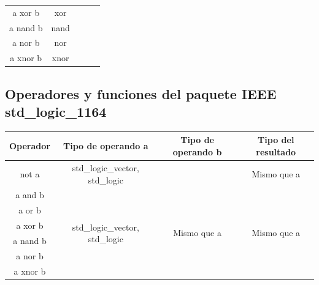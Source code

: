 \begin{table}[H]
\begin{tabular}{|c|c|c|c|c|}
		\cline{1-2}
		a xor b  & xor               &                                             &                                    &                                    \\
		\cline{1-2}
		a nand b & nand              &                                             &                                    &                                    \\
		\cline{1-2}
		a nor b  & nor               &                                             &                                    &                                    \\
		\cline{1-2}
		a xnor b & xnor              &                                             &                                    &                                    \\
		\hline
	\end{tabular}
\end{table}

\subsection{Operadores y funciones del paquete IEEE std\_logic\_1164}
\begin{table}[H]
	\begin{tabular}{|c|c|c|c|}
		\hline
		\rowcolor{gray}
		Operador & Tipo de operando a                              & Tipo de operando b           & Tipo del resultado           \\
		\hline
		not a    & std\_logic\_vector, std\_logic                  &                              & Mismo que a                  \\
		\hline
		a and b  & \multirow{6}{*}{std\_logic\_vector, std\_logic} & \multirow{6}{*}{Mismo que a} & \multirow{6}{*}{Mismo que a} \\
		\cline{1-1}
		a or b   &                                                 &                              &                              \\
		\cline{1-1}
		a xor b  &                                                 &                              &                              \\
		\cline{1-1}
		a nand b &                                                 &                              &                              \\
		\cline{1-1}
		a nor b  &                                                 &                              &                              \\
		\cline{1-1}
		a xnor b &                                                 &                              &                              \\
		\hline
	\end{tabular}
\end{table}

